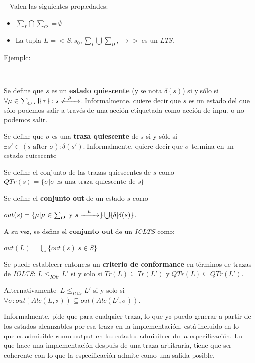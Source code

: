 \documentclass[]{article}
\begin{document}
~\newline
Valen las siguientes propiedades:
\begin{itemize}
	\item $\sum_I \bigcap \sum_O = \emptyset$
	\item La tupla $L = <S,s_0,\sum_I \bigcup \sum_O,\rightarrow>$ es un \textit{LTS}.
\end{itemize}

\underline{Ejemplo}:

~\newline

Se define que $s$ es un \textbf{estado quiescente} (y se nota $\delta(s)$) si y sólo si $\forall \mu \in \sum_O \bigcup \{\tau\}:s\not\xrightarrow{\hspace*{0.3cm} \mu \hspace*{0.3cm}}$. Informalmente, quiere decir que $s$ es un estado del que sólo podemos salir a través de una acción etiquetada como acción de input o no podemos salir.
~\newline

Se define que $\sigma$ es una \textbf{traza quiescente} de $s$ si y sólo si $\exists s' \in (s \text{ after } \sigma): \delta(s')$. Informalmente, quiere decir que $\sigma$ termina en un estado quiescente.

Se define el conjunto de las trazas quiescentes de $s$ como $QTr(s) = \{\sigma | \sigma \text{ es una traza quiescente de }s\}$
~\newline

Se define el \textbf{conjunto out} de un estado $s$ como
\begin{center}
	$out(s) = \{\mu | \mu \in \sum_O \text{ y } s\xrightarrow{\hspace*{0.3cm} \mu \hspace*{0.3cm}}\} \bigcup \{\delta | \delta{(s)}\}$.
\end{center}

A su vez, se define el \textbf{conjunto out} de un \textit{IOLTS} como:
\begin{center}
	$out(L) = \bigcup\{out(s) | s\in S\}$
\end{center}

Se puede establecer entonces un \textbf{criterio de conformance} en términos de trazas de \textit{IOLTS}: $L\leq_{IOtr} L'$ si y solo si $Tr(L)\subseteq Tr(L')$ y $QTr(L) \subseteq QTr(L')$.

Alternativamente, $L\leq_{IOtr} L'$ si y solo si $\forall \sigma : out(Alc(L,\sigma)) \subseteq out(Alc(L',\sigma))$.

Informalmente, pide que para cualquier traza, lo que yo puedo generar a partir de los estados alcanzables por esa traza en la implementación, está incluido en lo que es admisible como output en los estados admisibles de la especificación. Lo que hace una implementación después de una traza arbitraria, tiene que ser coherente con lo que la especificación admite como una salida posible.
\end{document}
